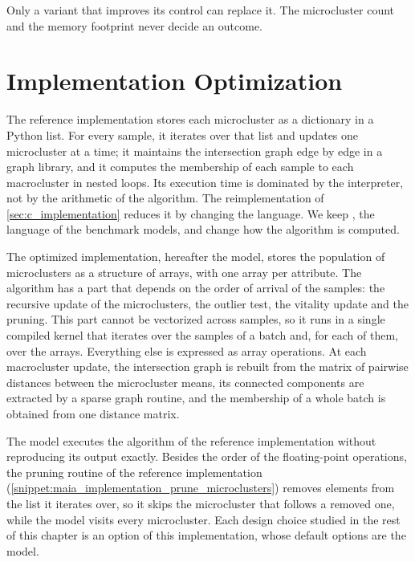 Only a variant that improves its control can replace it. The microcluster count and the memory footprint never decide an outcome.

\section{Implementation Optimization}
\label{sec:mi_optimization}

The reference implementation stores each microcluster as a dictionary in a Python list. For every sample, it iterates over that list and updates one microcluster at a time; it maintains the intersection graph edge by edge in a graph library, and it computes the membership of each sample to each macrocluster in nested loops. Its execution time is dominated by the interpreter, not by the arithmetic of the algorithm. The reimplementation of \cref{sec:c_implementation} reduces it by changing the language. We keep , the language of the benchmark models, and change how the algorithm is computed.

The optimized implementation, hereafter the  model, stores the population of microclusters as a structure of arrays, with one array per attribute. The algorithm has a part that depends on the order of arrival of the samples: the recursive update of the microclusters, the outlier test, the vitality update and the pruning. This part cannot be vectorized across samples, so it runs in a single compiled kernel that iterates over the samples of a batch and, for each of them, over the arrays. Everything else is expressed as array operations. At each macrocluster update, the intersection graph is rebuilt from the matrix of pairwise distances between the microcluster means, its connected components are extracted by a sparse graph routine, and the membership of a whole batch is obtained from one distance matrix.

The  model executes the algorithm of the reference implementation without reproducing its output exactly. Besides the order of the floating-point operations, the pruning routine of the reference implementation (\cref{snippet:maia_implementation_prune_microclusters}) removes elements from the list it iterates over, so it skips the microcluster that follows a removed one, while the  model visits every microcluster. Each design choice studied in the rest of this chapter is an option of this implementation, whose default options are the  model.

